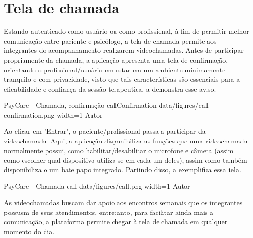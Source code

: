 \section{Tela de chamada}
\label{sec:chamada}

Estando autenticado como usuário ou como profissional, à fim de permitir melhor comunicação entre paciente e psicólogo, a tela de chamada permite aos integrantes do acompanhamento realizarem videochamadas. Antes de participar propriamente da chamada, a aplicação apresenta uma tela de confirmação, orientando o profissional/usuário em estar em um ambiente minimamente tranquilo e com privacidade, visto que tais características são essenciais para a eficabilidade e confiança da sessão terapeutica, a  demonstra esse aviso.

\image
    {PsyCare - Chamada, confirmação}
    {callConfirmation}
    {data/figures/call-confirmation.png}
    {width=1\textwidth}
    {Autor}

Ao clicar em "Entrar", o paciente/profissional passa a participar da videochamada. Aqui, a aplicação disponibiliza as funções que uma videochamada normalmente possui, como habilitar/desabilitar o microfone e câmera (assim como escolher qual dispositivo utiliza-se em cada um deles), assim como também disponibiliza o um bate papo integrado. Partindo disso, a  exemplifica essa tela.

\image
    {PsyCare - Chamada}
    {call}
    {data/figures/call.png}
    {width=1\textwidth}
    {Autor}

As videochamadas buscam dar apoio aos encontros semanais que os integrantes possuem de seus atendimentos, entretanto, para facilitar ainda mais a comunicação, a plataforma permite chegar à tela de chamada em qualquer momento do dia. 